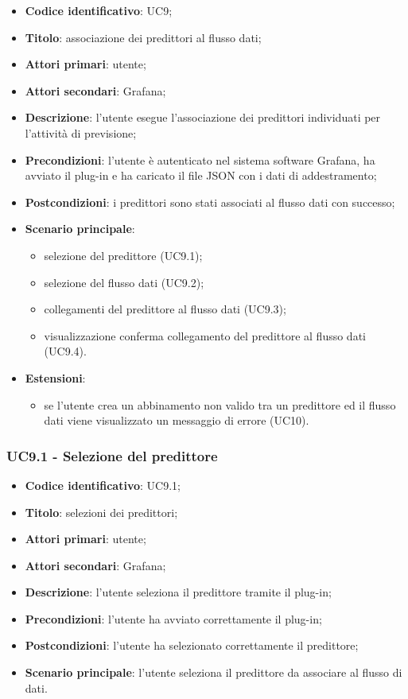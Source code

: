 \begin{itemize}
	\item \textbf{Codice identificativo}: UC9;
	\item \textbf{Titolo}: associazione dei predittori al flusso dati;
	\item \textbf{Attori primari}: utente;
	\item \textbf{Attori secondari}: Grafana\glo;
	\item \textbf{Descrizione}: l'utente esegue l'associazione dei predittori individuati per l'attività di previsione;
	\item \textbf{Precondizioni}: l'utente è autenticato nel sistema software Grafana\glosp, ha avviato il plug-in e ha caricato il file JSON con i dati di addestramento;
	\item \textbf{Postcondizioni}: i predittori sono stati associati al flusso dati con successo;
	\item \textbf{Scenario principale}: 
		\begin{itemize}
			\item selezione del predittore (UC9.1);
			\item selezione del flusso dati (UC9.2);
			\item collegamenti del predittore al flusso dati (UC9.3);
			\item visualizzazione conferma collegamento del predittore al flusso dati (UC9.4).
		\end{itemize}
	\item \textbf{Estensioni}:
		\begin{itemize}
			\item se l'utente crea un abbinamento non valido tra un predittore ed il flusso dati viene visualizzato un messaggio di errore (UC10).
		\end{itemize}
\end{itemize}

\subsubsection{UC9.1 - Selezione del predittore}
\begin{itemize}
	\item \textbf{Codice identificativo}: UC9.1;
	\item \textbf{Titolo}: selezioni dei predittori;
	\item \textbf{Attori primari}: utente;
	\item \textbf{Attori secondari}: Grafana\glo;
	\item \textbf{Descrizione}: l'utente seleziona il predittore tramite il plug-in;
	\item \textbf{Precondizioni}: l'utente ha avviato correttamente il plug-in;
	\item \textbf{Postcondizioni}: l'utente ha selezionato correttamente il predittore;
	\item \textbf{Scenario principale}: l'utente seleziona il predittore da associare al flusso di dati.
\end{itemize}

